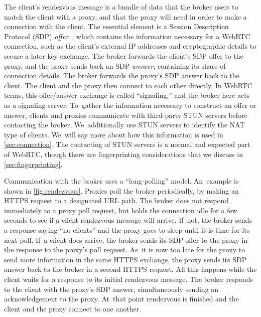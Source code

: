 \documentclass[letterpaper,twocolumn]{article}
\newcommand{\firstterm}[1]{\textit{#1}}
\begin{document}
The client's rendezvous message
is a bundle of data that the broker users to match the client with a proxy,
and that the proxy will need in order to make a connection with the client.
The essential element is a
Session Description Protocol (SDP) \firstterm{offer}~\cite{rfc8839},
which contains the information necessary for a WebRTC connection,
such as the client's external IP addresses
and cryptographic details to secure a later key exchange.
The broker forwards the client's SDP offer to the proxy,
and the proxy sends back an SDP \firstterm{answer},
containing its share of connection details.
The broker forwards the proxy's SDP answer back to the client.
The client and the proxy then connect to each other directly.
In WebRTC terms, this offer/\allowbreak answer exchange is called
``signaling,'' and the broker here acts as a signaling server.
To~gather the information necessary to construct an offer or answer,
clients and proxies communicate with third-party STUN servers
before contacting the broker.
We~additionally use STUN servers to identify the NAT type of clients.
We~will say more about how this information is used in \autoref{sec:connection}.
The contacting of STUN servers is a normal and expected part of WebRTC,
though there are fingerprinting considerations
that we discuss in \autoref{sec:fingerprinting}.

Communication with the broker uses a ``long-polling'' model.
An~example is shown in \autoref{fig:rendezvous}.
Proxies poll the broker periodically,
by making an HTTPS request to a designated URL path.
The broker does not respond immediately to a proxy poll request,
but holds the connection idle for a few seconds
to see if a client rendezvous message will arrive.
If~not, the broker sends a response saying ``no clients''
and the proxy goes to sleep until it is time for its next poll.
If~a client does arrive,
the broker sends its SDP offer to the proxy
in the response to the proxy's poll request.
As~it is now too late for the proxy to send more information
in the same HTTPS exchange,
the proxy sends its SDP answer back to the broker
in a second HTTPS request.
All this happens while the client waits for a response
to its initial rendezvous message.
The broker responds to the client with the proxy's SDP answer,
simultaneously sending an acknowledgement to the proxy.
At~that point rendezvous is finished
and the client and the proxy connect to one another.
\end{document}
